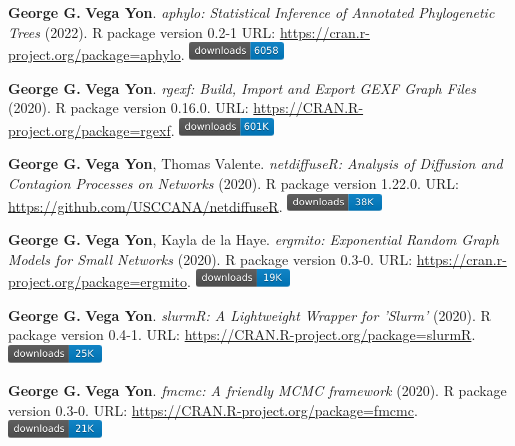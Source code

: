 \documentclass[letterpaper, 9pt]{article}
\begin{document}
\begin{enumerate}[label={[}\arabic*{]},labelindent=5\parindent,labelsep=8pt]
\item {\bfseries George G.} {\bfseries Vega Yon}. \textit{{aphylo: Statistical Inference of Annotated Phylogenetic Trees}} (2022). R package version 0.2-1 {\small URL}: \url{https://cran.r-project.org/package=aphylo}. \includegraphics[width=2.5cm]{fig/cran-downloads-aphylo.pdf}
\item {\bfseries George G.} {\bfseries Vega Yon}. \textit{rgexf: Build, Import and Export GEXF Graph Files} (2020). R package version 0.16.0. {\small URL}: \url{https://CRAN.R-project.org/package=rgexf}. \includegraphics[width=2.5cm]{fig/cran-downloads-rgexf.pdf} 
\item {\bfseries George G.} {\bfseries Vega Yon}, Thomas Valente. \textit{{{netdiffuseR: Analysis of Diffusion and Contagion Processes on Networks}}} (2020). R package version 1.22.0. {\small URL}: \url{https://github.com/USCCANA/netdiffuseR}. \includegraphics[width=2.5cm]{fig/cran-downloads-netdiffuser.pdf} 
\item {\bfseries George G.} {\bfseries Vega Yon}, Kayla de la Haye. \textit{ergmito: Exponential Random Graph Models for Small Networks} (2020). R package version 0.3-0. {\small URL}: \url{https://cran.r-project.org/package=ergmito}. \includegraphics[width=2.5cm]{fig/cran-downloads-ergmito.pdf} 
\item {\bfseries George G.} {\bfseries Vega Yon}. \textit{slurmR: A Lightweight Wrapper for 'Slurm'} (2020). R package version 0.4-1. {\small URL}: \url{https://CRAN.R-project.org/package=slurmR}. \includegraphics[width=2.5cm]{fig/cran-downloads-slurmr.pdf} 
\item {\bfseries George G.} {\bfseries Vega Yon}. \textit{fmcmc: A friendly MCMC framework} (2020). R package version 0.3-0. {\small URL}: \url{https://CRAN.R-project.org/package=fmcmc}. \includegraphics[width=2.5cm]{fig/cran-downloads-fmcmc.pdf} 
\end{enumerate}
\end{document}
